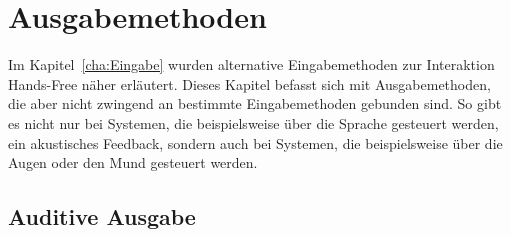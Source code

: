 \chapter{Ausgabemethoden}
\label{cha:Ausgabe}

Im Kapitel~\ref{cha:Eingabe} wurden alternative Eingabemethoden zur Interaktion Hands-Free näher erläutert. Dieses Kapitel befasst sich mit Ausgabemethoden, die aber nicht zwingend an bestimmte Eingabemethoden gebunden sind. So gibt es nicht nur bei Systemen, die beispielsweise über die Sprache gesteuert werden, ein akustisches Feedback, sondern auch bei Systemen, die beispielsweise über die Augen oder den Mund gesteuert werden. 


\section{Auditive Ausgabe}

